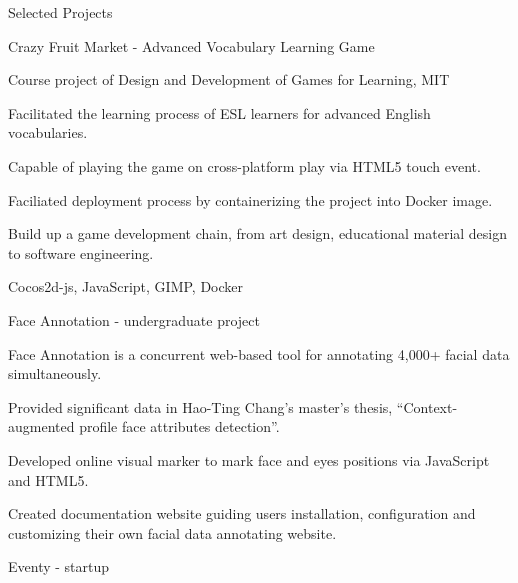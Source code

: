 \documentclass{cv}
\begin{document}


\begin{cvSection}{Selected Projects}

\begin{projectSubsection}{Crazy Fruit Market}{ - }{Advanced Vocabulary Learning Game}

\item Course project of Design and Development of Games for Learning, MIT
\item Facilitated the learning process of ESL learners for advanced English vocabularies.
\item Capable of playing the game on cross-platform play via HTML5 touch event.
\item Faciliated deployment process by containerizing the project into Docker image.
\item Build up a game development chain, from art design, educational material design to software engineering.
\item Cocos2d-js, JavaScript, GIMP, Docker

\end{projectSubsection}

\begin{projectSubsection}{Face Annotation}{ - }{undergraduate project}

\item Face Annotation is a concurrent web-based tool for annotating 4,000+ facial data simultaneously.
\item Provided significant data in Hao-Ting Chang’s master’s thesis, “Context-augmented profile face attributes detection”.
\item Developed online visual marker to mark face and eyes positions via JavaScript and HTML5.  
\item Created documentation website guiding users installation, configuration and customizing their own facial data annotating website. 

\end{projectSubsection}

\begin{projectSubsection}{Eventy}{ - }{startup}


\end{projectSubsection}
\end{cvSection}
\end{document}
